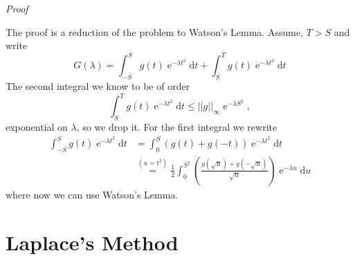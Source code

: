 \documentclass[]{report}
\makeatletter
\DeclareMathOperator{\ee}{e}
\newcommand{\dd}{\mathrm{d}}
\numberwithin{equation}{section} %
\newenvironment{Mproof}[1][Proof]{\par
	\pushQED{\qed}%
	\normalfont \topsep6\p@\@plus6\p@\relax
	\trivlist
	\item\relax
	{\itshape
		#1\@addpunct{.}}\hspace\labelsep\ignorespaces
}{%
	\popQED\endtrivlist\@endpefalse
}
\makeatother
\begin{document}
\begin{Mproof}
	The proof is a reduction of the problem to Watson's Lemma. Assume, $T>S$ and write
	$$G(\lambda) = \int_{-S}^{S} g(t) \ee^{-\lambda t^2} \dd t + \int_{S}^{T} g(t) \ee^{-\lambda t^2} \dd t $$
	The second integral we know to be of order
	$$\int_{S}^{T} g(t) \ee^{-\lambda t^2} \dd t \leq ||g||_{\infty} \ee^{-\lambda S^2},$$
	exponential on $\lambda$, so we drop it. For the first integral we rewrite
	\begin{equation*}
		\begin{split}
			\int_{-S}^{S} g(t) \ee^{-\lambda t^2} \dd t & = \int_{0}^{S} (g(t) + g(-t)) \ee^{-\lambda t^2}\dd t \\
			& \stackrel{(u= t^2)}{=} \frac{1}{2} \int_{0}^{S^2} \left(\frac{g\left(\sqrt{u}\right) + g\left(-\sqrt{u}\right)}{\sqrt{u}}\right) \ee^{-\lambda u} \dd u
		\end{split}
	\end{equation*}
	where now we can use Watson's Lemma.
\end{Mproof}

\section{Laplace's Method}
\end{document}
